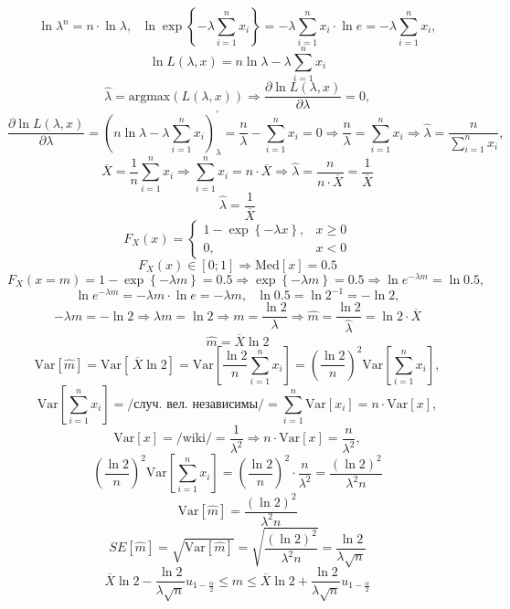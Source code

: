 \documentclass[a4paper, 12pt]{article}
\begin{document}
    $$\ln{\lambda^n}=n\cdot\ln{\lambda},\,\,\,\,\ln{\exp{\left\{-\lambda\sum\limits_{i=1}^{n}x_i\right\}}}=-\lambda\sum\limits_{i=1}^{n}x_i\cdot\ln{e}=-\lambda\sum\limits_{i=1}^{n}x_i,$$
    $$\ln{L\left(\lambda,x\right)}=n\ln{\lambda}-\lambda\sum\limits_{i=1}^{n}x_i$$
    $$\hat{\lambda}=\text{argmax}\left(L\left(\lambda,x\right)\right)\Rightarrow \dfrac{\partial\ln{L\left(\lambda,x\right)}}{\partial\lambda}=0,$$
    $$\dfrac{\partial\ln{L\left(\lambda,x\right)}}{\partial\lambda}=\left(n\ln{\lambda}-\lambda\sum\limits_{i=1}^{n}x_i\right)_{\lambda}^{\prime}=
    \dfrac{n}{\lambda}-\sum\limits_{i=1}^{n}x_i=0\Rightarrow\dfrac{n}{\lambda}=\sum\limits_{i=1}^{n}x_i\Rightarrow\hat{\lambda}=\dfrac{n}{\sum_{i=1}^{n}x_i},$$
    $$\overline{X}=\dfrac{1}{n}\sum\limits_{i=1}^{n}x_i\Rightarrow\sum\limits_{i=1}^{n}x_i=n\cdot\overline{X}\Rightarrow\hat{\lambda}=\dfrac{n}{n\cdot\overline{X}}=\dfrac{1}{\overline{X}}$$
    $$\hat{\lambda}=\dfrac{1}{\overline{X}}$$
    $$F_X(x)=\begin{cases}
        1-\exp{\left\{-\lambda x\right\}},& x\geq0\\
        0,& x<0
    \end{cases}$$
    $$F_X(x)\in\left[0;1\right]\Rightarrow\text{Med}\left[x\right]=0.5$$
    $$F_X(x=m)=1-\exp{\left\{-\lambda m\right\}}=0.5\Rightarrow\exp{\left\{-\lambda m\right\}}=0.5\Rightarrow\ln{e^{-\lambda m}}=\ln{0.5},$$
    $$\ln{e^{-\lambda m}}=-\lambda m\cdot\ln{e}=-\lambda m,\,\,\,\,\ln{0.5}=\ln{2^{-1}}=-\ln{2},$$
    $$-\lambda m=-\ln{2}\Rightarrow\lambda m=\ln{2}\Rightarrow m=\dfrac{\ln{2}}{\lambda}\Rightarrow\hat{m}=\dfrac{\ln{2}}{\hat{\lambda}}=\ln{2}\cdot\overline{X}$$
    $$\hat{m}=\overline{X}\ln{2}$$
    $$\text{Var}\left[\hat{m}\right]=\text{Var}\left[\,\overline{X}\ln{2}\right]=\text{Var}\left[\dfrac{\ln{2}}{n}\sum_{i=1}^{n}x_i\right]=\left(\dfrac{\ln{2}}{n}\right)^2\text{Var}\left[\sum_{i=1}^{n}x_i\right],$$
    $$\text{Var}\left[\sum_{i=1}^{n}x_i\right]=\text{/случ. вел. независимы/}=\sum_{i=1}^{n}\text{Var}\left[x_i\right]=n\cdot\text{Var}\left[x\right],$$
    $$\text{Var}\left[x\right]=\text{/wiki/}=\dfrac{1}{\lambda^2}\Rightarrow n\cdot\text{Var}\left[x\right]=\dfrac{n}{\lambda^2},$$
    $$\left(\dfrac{\ln{2}}{n}\right)^2\text{Var}\left[\sum_{i=1}^{n}x_i\right]=\left(\dfrac{\ln{2}}{n}\right)^2\cdot\dfrac{n}{\lambda^2}=\dfrac{\left(\ln{2}\right)^2}{\lambda^2 n}$$
    $$\text{Var}\left[\hat{m}\right]=\dfrac{\left(\ln{2}\right)^2}{\lambda^2 n}$$
    $$SE\left[\hat{m}\right]=\sqrt{\text{Var}\left[\hat{m}\right]}=\sqrt{\dfrac{\left(\ln{2}\right)^2}{\lambda^2 n}}=\dfrac{\ln{2}}{\lambda\sqrt{n}}$$
    $$\overline{X}\ln{2}-\dfrac{\ln{2}}{\lambda\sqrt{n}}u_{1-\frac{\alpha}{2}}\leq m\leq\overline{X}\ln{2}+\dfrac{\ln{2}}{\lambda\sqrt{n}}u_{1-\frac{\alpha}{2}}$$
\end{document}
